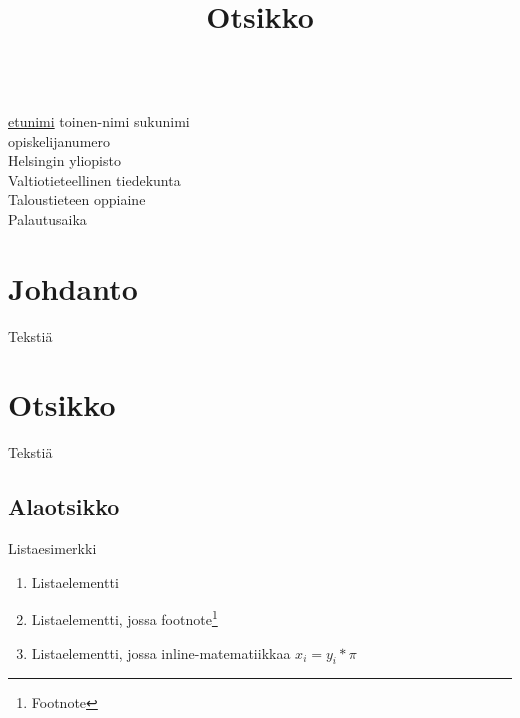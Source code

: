 \documentclass[12pt,a4paper,finnish]{article}
\theoremstyle{plain}
\theoremstyle{definition}
\theoremstyle{remark}
\theoremstyle{figure}
\begin{document}
\begin{titlepage}
\linespread{1}
\title{\vspace{20px} \hspace{0px}Otsikko \hspace{0px}}
\date{}
\maketitle
\thispagestyle{empty}
\vspace*{350px}
\begin{tabbing}
\hspace*{300px} \= \\
\> \underline{etunimi} toinen-nimi sukunimi \\ %
\> opiskelijanumero  \\
\> Helsingin yliopisto \\
\> Valtiotieteellinen tiedekunta \\
\> Taloustieteen oppiaine \\
\> Palautusaika %
\end{tabbing}
\end{titlepage}
\pagebreak

\tableofcontents
\pagebreak

\section{Johdanto}

Tekstiä

\pagebreak

\section{Otsikko}\label{}

Tekstiä

\subsection{Alaotsikko}

Listaesimerkki

\begin{enumerate}

    \item Listaelementti

    \item Listaelementti, jossa footnote\footnote{Footnote}

    \item Listaelementti, jossa inline-matematiikkaa $x_i = y_i * \pi$

\end{enumerate}
\end{document}
